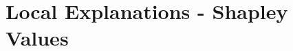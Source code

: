 \documentclass[11pt,compress,t,notes=noshow, aspectratio=169, xcolor=table]{beamer}
\begin{document}
% 
% 
% 
% 
%
% 
% 
% 
% 
% 
% 
%
% 
% 
% 
%
% 

\section{Local Explanations - Shapley Values}


\end{document}
